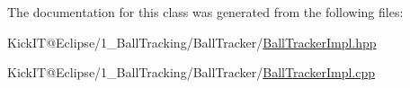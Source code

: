 The documentation for this class was generated from the following files\+:\begin{DoxyCompactItemize}
\item 
Kick\+I\+T@\+Eclipse/1\+\_\+\+Ball\+Tracking/\+Ball\+Tracker/\hyperlink{_ball_tracker_impl_8hpp}{Ball\+Tracker\+Impl.\+hpp}\item 
Kick\+I\+T@\+Eclipse/1\+\_\+\+Ball\+Tracking/\+Ball\+Tracker/\hyperlink{_ball_tracker_impl_8cpp}{Ball\+Tracker\+Impl.\+cpp}\end{DoxyCompactItemize}
